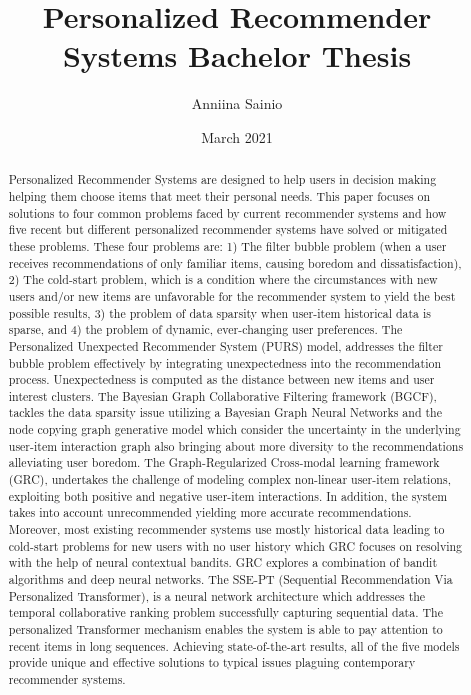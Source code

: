 \documentclass[english,twoside,censored,tkt,sw-line]{HYthesisML}
\title{
Personalized Recommender Systems
        Bachelor Thesis}
\author{Anniina Sainio}
\date{March 2021}
\begin{document}
\maketitle
\begin{otherlanguage}{english}
\begin{abstract}
Personalized Recommender Systems are designed to help users in decision making helping them choose items that meet their personal needs. This paper focuses on solutions to four common problems faced by current recommender systems and how five recent but different personalized recommender systems have solved or mitigated these problems. These four problems are: 1) The filter bubble problem (when a user receives recommendations of only familiar items, causing boredom and dissatisfaction), 2) The cold-start problem, which is a condition where the circumstances  with new users and/or new items are unfavorable for the recommender system to yield the best possible results,  3) the problem of data sparsity when user-item historical data is sparse, and 4) the problem of dynamic, ever-changing user preferences.
The Personalized Unexpected Recommender System (PURS) model, addresses the filter bubble problem effectively by integrating unexpectedness into the recommendation process. Unexpectedness is computed as the distance between new items and user interest clusters. The Bayesian Graph Collaborative Filtering framework (BGCF), tackles the data sparsity issue utilizing a Bayesian Graph Neural Networks and the node copying graph generative model which consider the uncertainty in the underlying user-item interaction graph also bringing about more diversity to the recommendations alleviating user boredom. The Graph-Regularized Cross-modal learning framework (GRC), undertakes the challenge of modeling complex non-linear user-item relations, exploiting both positive and negative user-item interactions. In addition, the system takes into account unrecommended yielding more accurate recommendations. Moreover, most existing recommender systems use mostly historical data leading to cold-start problems for new users with no user history which GRC focuses on resolving with the help of neural contextual bandits. GRC explores a combination of bandit algorithms and deep neural networks. The SSE-PT (Sequential Recommendation Via Personalized Transformer), is a neural network architecture which addresses the temporal collaborative ranking problem successfully capturing sequential data. The personalized Transformer mechanism enables the system is able to pay attention to recent items in long sequences. Achieving state-of-the-art results, all of the five models provide unique and effective solutions to typical issues plaguing contemporary recommender systems.

\end{abstract}
\end{otherlanguage}
\end{document}
